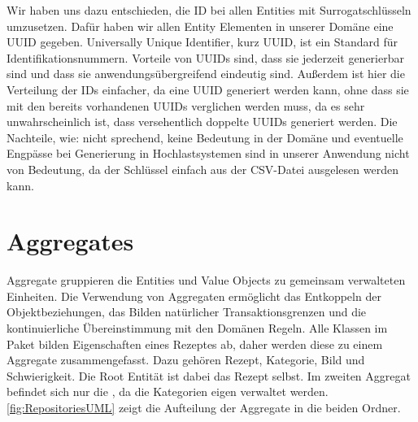 Wir haben uns dazu entschieden, die ID bei allen Entities mit Surrogatschlüsseln umzusetzen. Dafür haben wir allen Entity Elementen in unserer Domäne eine UUID gegeben. Universally Unique Identifier, kurz UUID, ist ein Standard für Identifikationsnummern. Vorteile von UUIDs sind, dass sie jederzeit generierbar sind und dass sie anwendungsübergreifend eindeutig sind. Außerdem ist hier die Verteilung der IDs einfacher, da eine UUID generiert werden kann, ohne dass sie mit den bereits vorhandenen UUIDs verglichen werden muss, da es sehr unwahrscheinlich ist, dass versehentlich doppelte UUIDs generiert werden. Die Nachteile, wie: nicht sprechend, keine Bedeutung in der Domäne und eventuelle Engpässe bei Generierung in
Hochlastsystemen sind in unserer Anwendung nicht von Bedeutung, da der Schlüssel einfach aus der CSV-Datei ausgelesen werden kann.

\section{Aggregates}
Aggregate gruppieren die Entities und Value Objects zu gemeinsam verwalteten Einheiten. Die Verwendung von Aggregaten ermöglicht das Entkoppeln der Objektbeziehungen, das Bilden natürlicher Transaktionsgrenzen und die kontinuierliche Übereinstimmung mit den Domänen Regeln.
Alle Klassen im Paket \href{https://github.com/MichaelaHaag/RezeptApp/tree/main/3-Domain-Code/src/main/java/de/rezeptapp/domain/Rezept}{} bilden Eigenschaften eines Rezeptes ab, daher werden diese zu einem Aggregate zusammengefasst. Dazu gehören Rezept, Kategorie, Bild und Schwierigkeit. Die Root Entität ist dabei das Rezept selbst. Im zweiten Aggregat befindet sich nur die \href{https://github.com/MichaelaHaag/RezeptApp/tree/main/3-Domain-Code/src/main/java/de/rezeptapp/domain/Kategorie}{}, da die Kategorien eigen verwaltet werden. \autoref{fig:RepositoriesUML} zeigt die Aufteilung der Aggregate in die beiden Ordner. 

